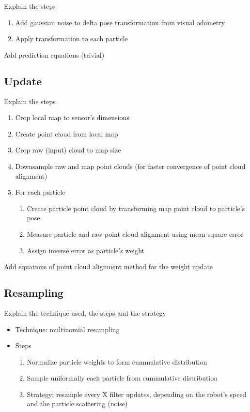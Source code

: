 Explain the steps

\begin{enumerate}
    \item Add gaussian noise to delta pose transformation from visual odometry
    \item Apply transformation to each particle
\end{enumerate}

\noindent
Add prediction equations (trivial)

\subsection{Update}

Explain the steps

\begin{enumerate}
    \item Crop local map to sensor's dimensions
    \item Create point cloud from local map
    \item Crop raw (input) cloud to map size
    \item Downsample raw and map point clouds (for faster convergence of point cloud alignment)
    \item For each particle
        \begin{enumerate}
            \item Create particle point cloud by transforming map point cloud to particle's pose
            \item Measure particle and raw point cloud alignment using mean square error
            \item Assign inverse error as particle's weight
        \end{enumerate}
\end{enumerate}

\noindent
Add equations of point cloud alignment method for the weight update

\subsection{Resampling}

Explain the technique used, the steps and the strategy

\begin{itemize}
    \item Technique: multinomial resampling
    \item Steps
        \begin{enumerate}
            \item Normalize particle weights to form cummulative distribution
            \item Sample uniformally each particle from cummulative distribution
            \item Strategy: resample every X filter updates, depending on the robot's speed and the particle scattering (noise)
        \end{enumerate}
\end{itemize}

